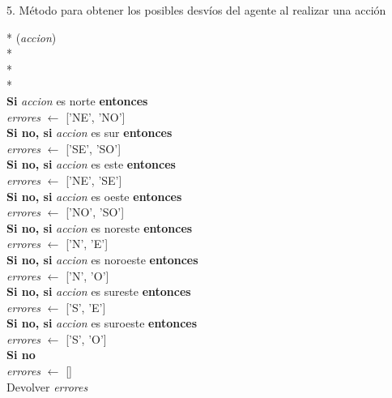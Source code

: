 \documentclass[conference,a4paper]{IEEEtran}
\begin{document}
5. Método para obtener los posibles desvíos del agente al realizar una acción
  \begin{pseudo}*
    (\textit{accion}) \\*
     \\*
     \\*
    \\
    \textbf{Si} \textit{accion} es norte \textbf{entonces} \\
    \> \textit{errores} $\leftarrow$ ['NE', 'NO'] \\
    \textbf{Si no, si} \textit{accion} es sur \textbf{entonces} \\
    \> \textit{errores} $\leftarrow$ ['SE', 'SO'] \\
    \textbf{Si no, si} \textit{accion} es este \textbf{entonces} \\
    \> \textit{errores} $\leftarrow$ ['NE', 'SE'] \\
    \textbf{Si no, si} \textit{accion} es oeste \textbf{entonces} \\
    \> \textit{errores} $\leftarrow$ ['NO', 'SO'] \\
    \textbf{Si no, si} \textit{accion} es noreste \textbf{entonces} \\
    \> \textit{errores} $\leftarrow$ ['N', 'E'] \\
    \textbf{Si no, si} \textit{accion} es noroeste \textbf{entonces} \\
    \> \textit{errores} $\leftarrow$ ['N', 'O'] \\
    \textbf{Si no, si} \textit{accion} es sureste \textbf{entonces} \\
    \> \textit{errores} $\leftarrow$ ['S', 'E'] \\
    \textbf{Si no, si} \textit{accion} es suroeste \textbf{entonces} \\
    \> \textit{errores} $\leftarrow$ ['S', 'O'] \\
    \textbf{Si no} \\
    \> \textit{errores} $\leftarrow$ [] \\
    Devolver \textit{errores}
  \end{pseudo}
\end{document}
